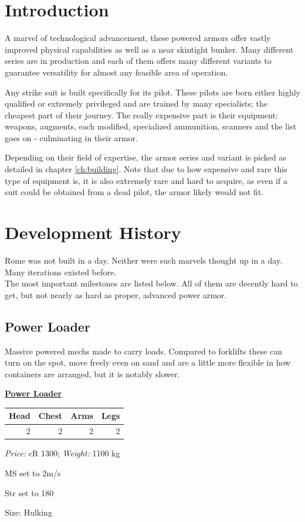 \documentclass[12pt,a4paper,openany,usenames,dvipsnames]{book}
\begin{document}
	

	\chapter{Introduction}
	A marvel of technological advancement, these powered armors offer vastly improved physical capabilities as well as a near skintight bunker. Many different series are in production and each of them offers many different variants to guarantee versatility for almost any feasible area of operation.\par
	Any strike suit is built specifically for its pilot. These pilots are born either highly qualified or extremely privileged and are trained by many specialists; the cheapest part of their journey. The really expensive part is their equipment: weapons, augments, each modified, specialized ammunition, scanners and the list goes on - culminating in their armor.\par
	Depending on their field of expertise, the armor series and variant is picked as detailed in chapter \ref{ch:building}.
	Note that due to how expensive and rare this type of equipment is,
		it is also extremely rare and hard to acquire,
		as even if a suit could be obtained from a dead pilot,
		the armor likely would not fit.
	
	\chapter{Development History}
	Rome was not built in a day. Neither were such marvels thought up in a day. Many iterations existed before.
	\\%
	The most important milestones are listed below. All of them are decently hard to get, but not nearly as hard as proper, advanced power armor.
	\section{Power Loader}
	Massive powered mechs made to carry loads. Compared to forklifts these can turn on the spot, move freely even on sand and are a little more flexible in how containers are arranged, but it is notably slower.
	\par
	\begin{minipage}{\columnwidth}
		\textbf{\ul{Power Loader}}\\
		\begin{tabular}{|r|r|r|r|}
			\hline
			Head & Chest & Arms & Legs\\
			\hline
			2 & 2 & 2 & 2\\
			\hline
		\end{tabular}\par
		\vspace{2mm}
		\textit{Price:} cR 1300; \textit{Weight:} 1100 kg\\
		\begin{sitemize}
			\item MS set to 2m/s
			\item Str set to 180
			\item Size: Hulking
		\end{sitemize}
	\end{minipage}
\end{document}
